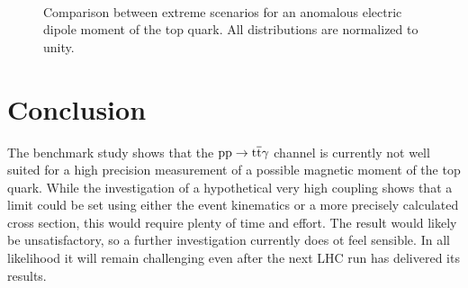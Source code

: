 \begin{figure}
\centering
  \\
  \caption{Comparison between extreme scenarios for an anomalous electric dipole moment of the top quark. All distributions are normalized to unity.}
  \label{fig_ano_comp_ex}
\end{figure}

\section{Conclusion}

The benchmark study shows that the $\mathrm{pp} \to \mathrm{t}\overline{\mathrm{t}} \gamma$ channel is currently not well suited for a high precision measurement of a possible magnetic moment of the top quark. While the investigation of a hypothetical very high coupling shows that a limit could be set using either the event kinematics or a more precisely calculated cross section, this would require plenty of time and effort. The result would likely be unsatisfactory, so a further investigation  currently does ot feel sensible. In all likelihood it will remain challenging even after the next LHC run has delivered its results.  \\
